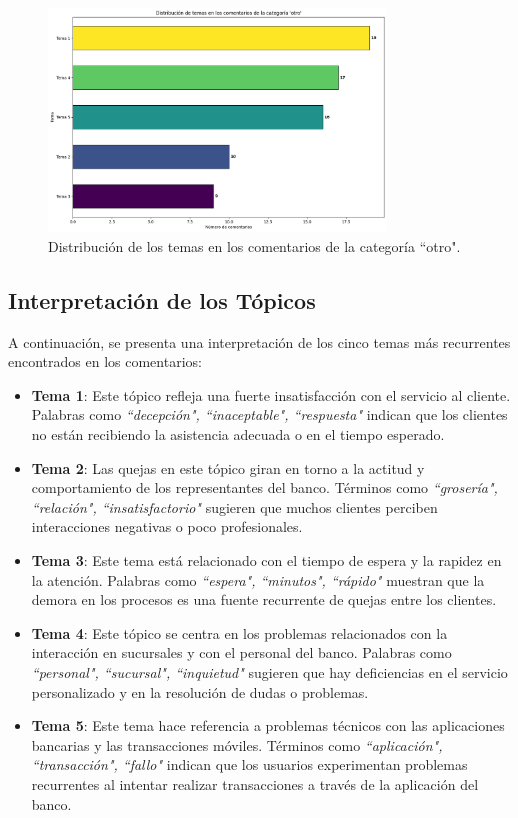 \documentclass{matematicasud}
\begin{document}
\begin{figure}[h!]
    \centering
    \includegraphics[width=0.8\textwidth]{imaged.png}
    \caption{Distribución de los temas en los comentarios de la categoría ``otro".}
    \label{fig:distribucion_temas}
\end{figure}

\subsection{Interpretación de los Tópicos}

A continuación, se presenta una interpretación de los cinco temas más recurrentes encontrados en los comentarios:

\begin{itemize}
    \item \textbf{Tema 1}: Este tópico refleja una fuerte insatisfacción con el servicio al cliente. Palabras como \textit{``decepción", ``inaceptable", ``respuesta"} indican que los clientes no están recibiendo la asistencia adecuada o en el tiempo esperado.
    
    \item \textbf{Tema 2}: Las quejas en este tópico giran en torno a la actitud y comportamiento de los representantes del banco. Términos como \textit{``grosería", ``relación", ``insatisfactorio"} sugieren que muchos clientes perciben interacciones negativas o poco profesionales.
    
    \item \textbf{Tema 3}: Este tema está relacionado con el tiempo de espera y la rapidez en la atención. Palabras como \textit{``espera", ``minutos", ``rápido"} muestran que la demora en los procesos es una fuente recurrente de quejas entre los clientes.
    
    \item \textbf{Tema 4}: Este tópico se centra en los problemas relacionados con la interacción en sucursales y con el personal del banco. Palabras como \textit{``personal", ``sucursal", ``inquietud"} sugieren que hay deficiencias en el servicio personalizado y en la resolución de dudas o problemas.
    
    \item \textbf{Tema 5}: Este tema hace referencia a problemas técnicos con las aplicaciones bancarias y las transacciones móviles. Términos como \textit{``aplicación", ``transacción", ``fallo"} indican que los usuarios experimentan problemas recurrentes al intentar realizar transacciones a través de la aplicación del banco.
\end{itemize}
\end{document}
